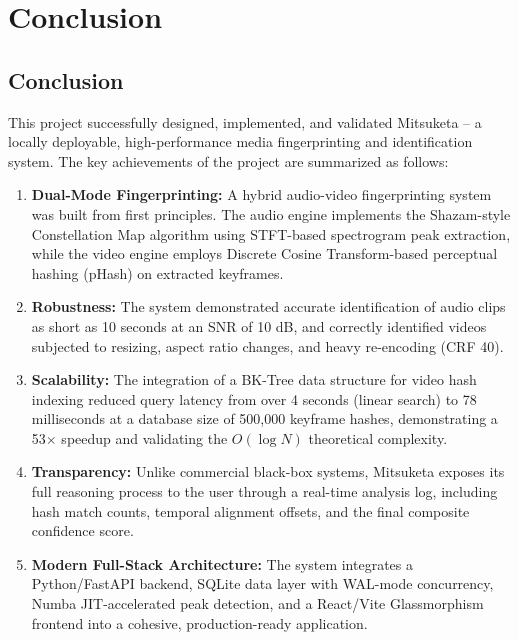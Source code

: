 \newpage
\chapter{Conclusion}

\section{Conclusion}
This project successfully designed, implemented, and validated Mitsuketa -- a locally deployable, high-performance media fingerprinting and identification system. The key achievements of the project are summarized as follows:

\begin{enumerate}
  \item \textbf{Dual-Mode Fingerprinting:} A hybrid audio-video fingerprinting system was built from first principles. The audio engine implements the Shazam-style Constellation Map algorithm using STFT-based spectrogram peak extraction, while the video engine employs Discrete Cosine Transform-based perceptual hashing (pHash) on extracted keyframes.

  \item \textbf{Robustness:} The system demonstrated accurate identification of audio clips as short as 10 seconds at an SNR of 10 dB, and correctly identified videos subjected to resizing, aspect ratio changes, and heavy re-encoding (CRF 40).

  \item \textbf{Scalability:} The integration of a BK-Tree data structure for video hash indexing reduced query latency from over 4 seconds (linear search) to 78 milliseconds at a database size of 500,000 keyframe hashes, demonstrating a 53$\times$ speedup and validating the $O(\log N)$ theoretical complexity.

  \item \textbf{Transparency:} Unlike commercial black-box systems, Mitsuketa exposes its full reasoning process to the user through a real-time analysis log, including hash match counts, temporal alignment offsets, and the final composite confidence score.

  \item \textbf{Modern Full-Stack Architecture:} The system integrates a Python/FastAPI backend, SQLite data layer with WAL-mode concurrency, Numba JIT-accelerated peak detection, and a React/Vite Glassmorphism frontend into a cohesive, production-ready application.
\end{enumerate}

